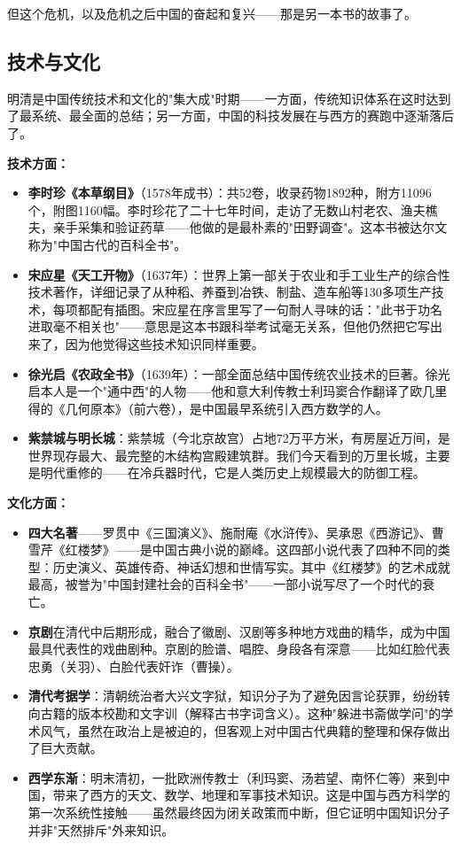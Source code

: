 \documentclass[a4paper,12pt]{ctexart}
\begin{document}
但这个危机，以及危机之后中国的奋起和复兴——那是另一本书的故事了。

\subsection*{技术与文化}

明清是中国传统技术和文化的"集大成"时期——一方面，传统知识体系在这时达到了最系统、最全面的总结；另一方面，中国的科技发展在与西方的赛跑中逐渐落后了。

\textbf{技术方面：}
\begin{itemize}
  \item \textbf{李时珍《本草纲目》}（1578年成书）：共52卷，收录药物1892种，附方11096个，附图1160幅。李时珍花了二十七年时间，走访了无数山村老农、渔夫樵夫，亲手采集和验证药草——他做的是最朴素的"田野调查"。这本书被达尔文称为"中国古代的百科全书"。
  \item \textbf{宋应星《天工开物》}（1637年）：世界上第一部关于农业和手工业生产的综合性技术著作，详细记录了从种稻、养蚕到冶铁、制盐、造车船等130多项生产技术，每项都配有插图。宋应星在序言里写了一句耐人寻味的话："此书于功名进取毫不相关也"——意思是这本书跟科举考试毫无关系，但他仍然把它写出来了，因为他觉得这些技术知识同样重要。
  \item \textbf{徐光启《农政全书》}（1639年）：一部全面总结中国传统农业技术的巨著。徐光启本人是一个"通中西"的人物——他和意大利传教士利玛窦合作翻译了欧几里得的《几何原本》（前六卷），是中国最早系统引入西方数学的人。
  \item \textbf{紫禁城与明长城}：紫禁城（今北京故宫）占地72万平方米，有房屋近万间，是世界现存最大、最完整的木结构宫殿建筑群。我们今天看到的万里长城，主要是明代重修的——在冷兵器时代，它是人类历史上规模最大的防御工程。
\end{itemize}

\textbf{文化方面：}
\begin{itemize}
  \item \textbf{四大名著}——罗贯中《三国演义》、施耐庵《水浒传》、吴承恩《西游记》、曹雪芹《红楼梦》——是中国古典小说的巅峰。这四部小说代表了四种不同的类型：历史演义、英雄传奇、神话幻想和世情写实。其中《红楼梦》的艺术成就最高，被誉为"中国封建社会的百科全书"——一部小说写尽了一个时代的衰亡。
  \item \textbf{京剧}在清代中后期形成，融合了徽剧、汉剧等多种地方戏曲的精华，成为中国最具代表性的戏曲剧种。京剧的脸谱、唱腔、身段各有深意——比如红脸代表忠勇（关羽）、白脸代表奸诈（曹操）。
  \item \textbf{清代考据学}：清朝统治者大兴文字狱，知识分子为了避免因言论获罪，纷纷转向古籍的版本校勘和文字训（解释古书字词含义）。这种"躲进书斋做学问"的学术风气，虽然在政治上是被迫的，但客观上对中国古代典籍的整理和保存做出了巨大贡献。
  \item \textbf{西学东渐}：明末清初，一批欧洲传教士（利玛窦、汤若望、南怀仁等）来到中国，带来了西方的天文、数学、地理和军事技术知识。这是中国与西方科学的第一次系统性接触——虽然最终因为闭关政策而中断，但它证明中国知识分子并非"天然排斥"外来知识。
\end{itemize}
\end{document}
